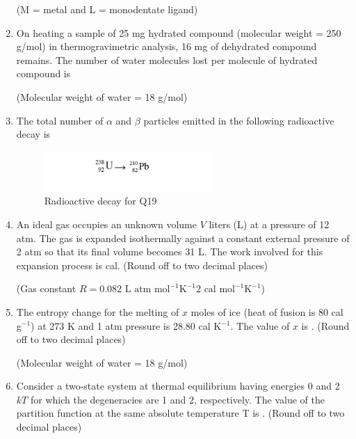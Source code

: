 \documentclass[journal,12pt,onecolumn]{IEEEtran}
\theoremstyle{remark}
\begin{document}
\begin{enumerate}
(M = metal and L = monodentate ligand)

\item On heating a sample of 25 mg hydrated compound (molecular weight = 250 g/mol) in thermogravimetric analysis, 16 mg of dehydrated compound remains. The number of water molecules lost per molecule of hydrated compound is \hfill{}

(Molecular weight of water = 18 g/mol)

\item The total number of $\alpha$ and $\beta$ particles emitted in the following radioactive decay is \hfill{}

\begin{figure}[h!]
    \centering
    \includegraphics[width=0.6\textwidth]{figs/image11.png}
    \caption{Radioactive decay for Q19}
    \label{fig:q19decay}
\end{figure}






\item An ideal gas occupies an unknown volume \(V\) liters (L) at a pressure of 12 atm. The gas is expanded isothermally against a constant external pressure of 2 atm so that its final volume becomes 31 L. The work involved for this expansion process is cal. (Round off to two decimal places) \hfill{}

(Gas constant \(R = 0.082 \text{ L atm mol}^{-1} \text{K}^{-1} 2 \text{ cal mol}^{-1} \text{K}^{-1}\))

\item The entropy change for the melting of \(x\) moles of ice (heat of fusion is 80 cal g\(^{-1}\)) at 273 K and 1 atm pressure is 28.80 cal K\(^{-1}\). The value of \(x\) is . (Round off to two decimal places)

(Molecular weight of water = 18 g/mol) \hfill{}

\item Consider a two-state system at thermal equilibrium having energies 0 and 2\(kT\) for which the degeneracies are 1 and 2, respectively. The value of the partition function at the same absolute temperature T is . (Round off to two decimal places)


\end{enumerate}
\end{document}
